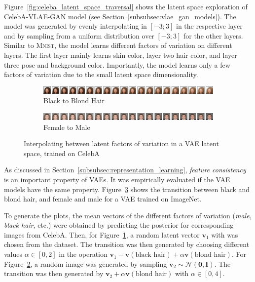 Figure~\ref{fig:celeba_latent_space_traversal} shows the latent space exploration of CelebA-\ac{VLAE}-\ac{GAN} model (see Section~\ref{subsubsec:vlae_gan_models}).
The model was generated by evenly interpolating in $[-3; 3]$ in the respective layer and by sampling from a uniform distribution over $[-3; 3]$ for the other layers.
Similar to \textsc{Mnist}, the model learns different factors of variation on different layers.
The first layer mainly learns skin color, layer two hair color, and layer three pose and background color.
Importantly, the model learns only a few factors of variation due to the small latent space dimensionality.

\begin{figure}
    \centering
    \begin{subfigure}{\textwidth}
        \includegraphics[width=\textwidth]{images/latent_space_traversals/vae_celeba_black_to_blond.png}
        \caption{Black to Blond Hair}
        \label{subfig:black_to_blond}
    \end{subfigure}
    \begin{subfigure}{\textwidth}
        \includegraphics[width=\textwidth]{images/latent_space_traversals/vae_celeba_man_to_woman.png}
        \caption{Female to Male}
        \label{subfig:female_to_male}
    \end{subfigure}
    \caption[Interpolating between black and blond hair, man and woman]{Interpolating between latent factors of variation in a VAE latent space, trained on CelebA}
    \label{fig:vae_celeba_black_to_blond_man_to_woman}
\end{figure}

As discussed in Section~\ref{subsubsec:representation_learning}, \textit{feature consistency} is an important property of \acp{VAE}.
It was empirically evaluated if the \ac{VAE} models have the same property.
Figure~\ref{fig:vae_celeba_black_to_blond_man_to_woman} shows the transition between black and blond hair, and female and male for a \ac{VAE} trained on ImageNet.

To generate the plots, the mean vectors of the different factors of variation (\textit{male}, \textit{black hair}, etc.) were obtained by predicting the posterior for corresponding images from CelebA.
Then, for Figure~\ref{subfig:black_to_blond}, a random latent vector $\bm{v}_1$ with  was chosen from the dataset.
The transition was then generated by choosing different values $\alpha \in [0, 2]$ in the operation $\bm{v}_1 - \bm{v}(\text{black hair}) + \alpha\bm{v}(\text{blond hair})$.
For Figure~\ref{subfig:female_to_male}, a random image was generated by sampling $\bm{v}_2\sim \mathcal{N}(\bm{0}, \bm{I})$.
The transition was then generated by $\bm{v}_2 + \alpha\bm{v}(\text{blond hair})$ with $\alpha \in [0, 4]$.

